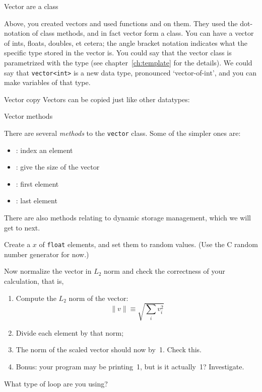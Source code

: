  {Vector are a class}
\label{sec:stdvector}

Above, you created vectors and used functions  and 
on them. They used the dot-notation of class methods, and in fact
vector form a  class. You can have a vector of ints,
floats, doubles, et cetera; 
the angle bracket notation indicates what the specific type stored in
the vector is.
You could say that the vector class is parametrized with the type (see
chapter~\ref{ch:template} for the details). We could say that
\lstinline{vector<int>} is a new data type, pronounced `vector-of-int', and you can
make variables of that type.

\begin{block}{Vector copy}
  \label{sl:vectorcopy}
  Vectors can be copied just like other datatypes:
\end{block}

 {Vector methods}

There are several \emph{methods}
to the \lstinline{vector} class. Some of the simpler ones are:
\begin{itemize}
\item {}: index an element
\item {}: give the size of the vector
\item {}: first element
\item {}: last element
\end{itemize}

There are also methods relating to dynamic storage management, which
we will get to next.

\begin{exercise}
  \label{ex:vectornormalize}
  Create a  $x$ of \lstinline{float} elements, and set them to random
  values. (Use the C random number generator for now.)

  Now normalize the vector in $L_2$ norm and check the correctness of
  your calculation, that is,
  \begin{enumerate}
  \item Compute the $L_2$ norm of the vector:
    \[ \| v\| \equiv \sqrt{\sum_iv_i^2} \]
  \item Divide each element by that norm;
  \item The norm of the scaled vector should now by~1. Check this.
  \item Bonus: your program may be printing~1, but is it actually~1?
    Investigate.
  \end{enumerate}
  What type of loop are you using?
\end{exercise}


